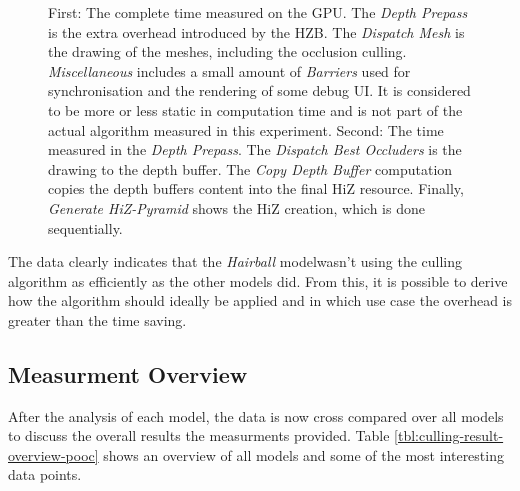 \begin{figure}[!htb]
  \caption{First: The complete time measured on the \ac{GPU}. The \emph{Depth Prepass} is the extra overhead 
  introduced by the \ac{HZB}. The \emph{Dispatch Mesh} is the drawing of the meshes, including the occlusion 
  culling. \emph{Miscellaneous} includes a small amount of \emph{Barriers} used for synchronisation and the 
  rendering of some debug \ac{UI}. It is considered to be more or less static in computation time and is not 
  part of the actual algorithm measured in this experiment. Second: The time measured in the \emph{Depth Prepass}. 
  The \emph{Dispatch Best Occluders} is the drawing to the depth buffer. The \emph{Copy Depth Buffer} computation 
  copies the depth buffers content into the final \ac{HiZ} resource. Finally, \emph{Generate HiZ-Pyramid} shows 
  the \ac{HiZ} creation, which is done sequentially.}
  \label{fig:hairball-gpu-times}
\end{figure}

\noindent
The data clearly indicates that the \emph{Hairball} modelwasn't using the culling algorithm as efficiently as 
the other models did. From this, it is possible to derive how the algorithm should ideally be applied and in 
which use case the overhead is greater than the time saving.




\subsection*{Measurment Overview}

After the analysis of each model, the data is now cross compared over all models to discuss the 
overall results the measurments provided. Table \ref{tbl:culling-result-overview-pooc} shows an overview of 
all models and some of the most interesting data points. 

